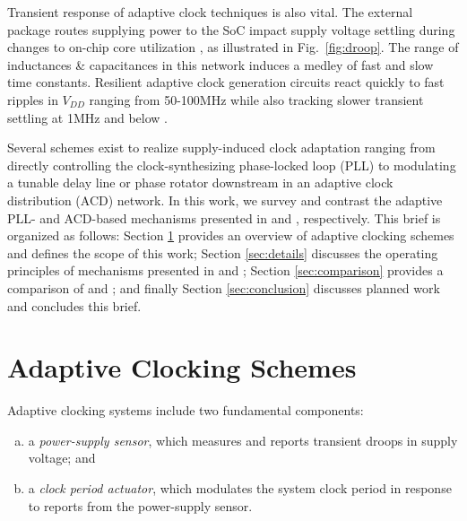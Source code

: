 \documentclass[twoside,9pt,journal,letterpage]{IEEEtran}
\begin{document}
\pubidadjcol
Transient response of adaptive clock techniques is also vital. The external package routes supplying power to the SoC impact supply voltage settling during changes to on-chip core utilization \cite{hashimoto2018}, as illustrated in Fig.\ \ref{fig:droop}. The range of inductances \& capacitances in this network induces a medley of fast and slow time constants. Resilient adaptive clock generation circuits react quickly to fast ripples in $V_{DD}$ ranging from 50-100MHz \cite{hashimoto2018,wilcox2015} while also tracking slower transient settling at 1MHz and below \cite{hashimoto2018,bowman2016,wilcox2015}.




Several schemes exist to realize supply-induced clock adaptation ranging from directly controlling the clock-synthesizing phase-locked loop (PLL)\cite{ahmad2017,hashimoto2018} to modulating a tunable delay line or phase rotator downstream in an adaptive clock distribution (ACD) network\cite{bowman2016,floyd2017,wilcox2015}. In this work, we survey and contrast the adaptive PLL- and ACD-based mechanisms presented in \cite{hashimoto2018} and \cite{wilcox2015}, respectively. This brief is organized as follows: Section \ref{sec:overview} provides an overview of adaptive clocking schemes and defines the scope of this work; Section \ref{sec:details} discusses the operating principles of mechanisms presented in \cite{hashimoto2018} and \cite{wilcox2015}; Section \ref{sec:comparison} provides a comparison of \cite{hashimoto2018} and \cite{wilcox2015}; and finally Section \ref{sec:conclusion} discusses planned work and concludes this brief.

\section{Adaptive Clocking Schemes}
\label{sec:overview}

Adaptive clocking systems include two fundamental components:

\begin{enumerate}[(a)]
\item a \textit{power-supply sensor}, which measures and
reports transient droops in supply voltage; and
\item a \textit{clock period actuator}, which modulates the
system clock period in response to reports from
the power-supply sensor.
\end{enumerate}
\end{document}
